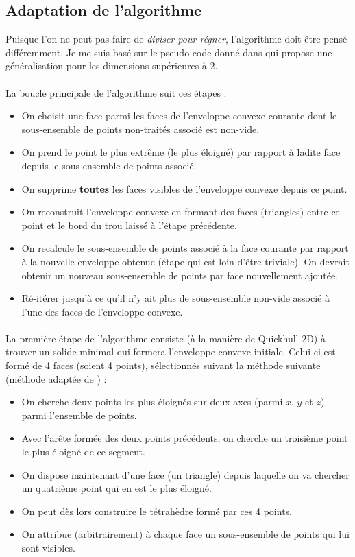 \documentclass[]{article}
\begin{document}
\subsection{Adaptation de l'algorithme}

Puisque l'on ne peut pas faire de \emph{diviser pour régner}, l'algorithme doit être pensé différemment. Je me suis basé sur le pseudo-code donné dans \cite{10.1145/235815.235821} qui propose une généralisation pour les dimensions supérieures à 2.

\paragraph{}
La boucle principale de l'algorithme suit ces étapes :
\begin{itemize}
	\item On choisit une face parmi les faces de l'enveloppe convexe courante dont le sous-ensemble de points non-traités associé est non-vide.
	\item On prend le point le plus extrême (le plus éloigné) par rapport à ladite face depuis le sous-ensemble de points associé.
	\item On supprime \textbf{toutes} les faces visibles de l'enveloppe convexe depuis ce point.
	\item On reconstruit l'enveloppe convexe en formant des faces (triangles) entre ce point et le bord du trou laissé à l'étape précédente.
	\item On recalcule le sous-ensemble de points associé à la face courante par rapport à la nouvelle enveloppe obtenue (étape qui est loin d'être triviale). On devrait obtenir un nouveau sous-ensemble de points par face nouvellement ajoutée.
	\item Ré-itérer jusqu'à ce qu'il n'y ait plus de sous-ensemble non-vide associé à l'une des faces de l'enveloppe convexe.
\end{itemize}

\paragraph{}
La première étape de l'algorithme consiste (à la manière de Quickhull 2D) à trouver un solide minimal qui formera l'enveloppe convexe initiale. Celui-ci est formé de 4 faces (soient 4 points), sélectionnés suivant la méthode suivante (méthode adaptée de \cite{smith}) :
\begin{itemize}
	\item On cherche deux points les plus éloignés sur deux axes (parmi $x$, $y$ et $z$) parmi l'ensemble de points.
	\item Avec l'arête formée des deux points précédents, on cherche un troisième point le plus éloigné de ce segment.
	\item On dispose maintenant d'une face (un triangle) depuis laquelle on va chercher un quatrième point qui en est le plus éloigné.
	\item On peut dès lors construire le tétrahèdre formé par ces 4 points.
	\item On attribue (arbitrairement) à chaque face un sous-ensemble de points qui lui sont visibles.
\end{itemize}
\end{document}
